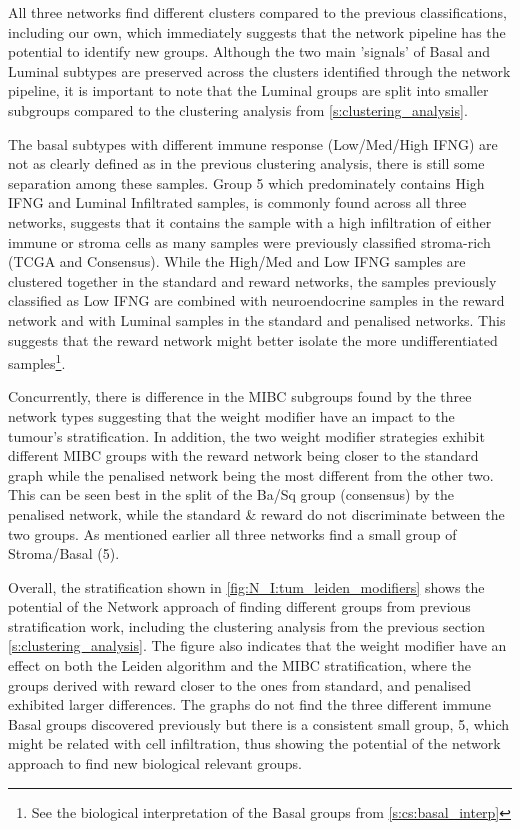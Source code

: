 All three networks find different clusters compared to the previous classifications, including our own, which immediately suggests that the network pipeline has the potential to identify new groups. Although the two main 'signals' of Basal and Luminal subtypes are preserved across the clusters identified through the network pipeline, it is important to note that the Luminal groups are split into smaller subgroups compared to the clustering analysis from \cref{s:clustering_analysis}. 

The basal subtypes with different immune response (Low/Med/High IFNG) are not as clearly defined as in the previous clustering analysis, there is still some separation among these samples. Group 5 which predominately contains High IFNG and Luminal Infiltrated samples, is commonly found across all three networks, suggests that it contains the sample with a high infiltration of either immune or stroma cells as many samples were previously classified stroma-rich (TCGA and Consensus). While the High/Med and Low IFNG samples are clustered together in the standard and reward networks, the samples previously classified as Low IFNG are combined with neuroendocrine samples in the reward network and with Luminal samples in the standard and penalised networks. This suggests that the reward network might better isolate the more undifferentiated samples\footnote{See the biological interpretation of the Basal groups from \cref{s:cs:basal_interp}}.

Concurrently, there is difference in the MIBC subgroups found by the three network types suggesting that the weight modifier have an impact to the tumour's stratification. In addition, the two weight modifier strategies exhibit different MIBC groups with the reward network being closer to the standard graph while the penalised network being the most different from the other two. This can be seen best in the split of the Ba/Sq group (consensus) by the penalised network, while the standard \& reward do not discriminate between the two groups. As mentioned earlier all three networks find a small group of Stroma/Basal (5).

Overall, the stratification shown in \cref{fig:N_I:tum_leiden_modifiers} shows the potential of the Network approach of finding different groups from previous stratification work, including the clustering analysis from the previous section \cref{s:clustering_analysis}. The figure also indicates that the weight modifier have an effect on both the Leiden algorithm and the MIBC stratification, where the groups derived with reward closer to the ones from standard, and penalised exhibited larger differences. The graphs do not find the three different immune Basal groups discovered previously but there is a consistent small group, 5, which might be related with cell infiltration, thus showing the potential of the network approach to find new biological relevant groups.


